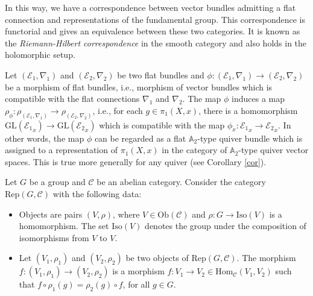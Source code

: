 \documentclass[12pt, reqno]{amsart}
\theoremstyle{plain}
\numberwithin{equation}{section}
\newcommand{\E}{\mathcal{E}}
\begin{document}
In this way, we have a correspondence between vector bundles admitting a flat connection and representations of the fundamental group. This correspondence is functorial and gives an equivalence between these two categories. It is known as the \emph{Riemann-Hilbert correspondence} in the smooth category and also holds in the holomorphic setup.


Let $(\E_1,\nabla_1)$ and $(\E_2,\nabla_2)$ be two flat bundles and $\phi:(\E_1,\nabla_1)\rightarrow (\E_2,\nabla_2)$ be a morphism of flat bundles, i.e., morphism of vector bundles which is compatible with the flat connections $\nabla_1$ and $\nabla_2$. The map $\phi$ induces a map $\rho_{\phi}: \rho_{(\E_1,\nabla_1)}\rightarrow \rho_{(\E_2,\nabla_2)}$, i.e., for each $g\in \pi_1(X,x)$, there is a homomorphism $\mathrm{GL}({\E_1}_x)\rightarrow \mathrm{GL}({\E_2}_x)$ which is compatible with the map $\phi_x:{\E_1}_x \rightarrow {\E_2}_x$. In other words, the map $\phi$ can be regarded as a flat $\mathbb{A}_2$-type quiver bundle which is assigned to a representation of $\pi_1(X,x)$ in the category of $\mathbb{A}_2$-type quiver vector spaces. This is true more generally for any quiver (see Corollary \ref{cor}).   







Let $G$ be a group and $\mathcal{C}$ be an abelian category. Consider the category $\mathrm{Rep}(G, \mathcal{C})$ with the following data:

\begin{itemize}
    \item Objects are pairs $(V, \rho)$, where $V \in \mathrm{Ob}(\mathcal{C})$ and $\rho: G\rightarrow \mathrm{Iso}(V)$ is a homomorphism. The set $\mathrm{Iso}(V)$ denotes the group under the composition of isomorphisms from $V$ to $V$.
    \item Let $(V_1,\rho_1)$ and $(V_2,\rho_2)$ be two objects of $\mathrm{Rep}(G,\mathcal{C})$. The morphism $f:(V_1,\rho_1) \rightarrow (V_2,\rho_2)$ is a morphism $f: V_1 \rightarrow V_2 \in \mathrm{Hom}_{\mathcal{C}}(V_1,V_2)$ such that $f\circ \rho_1(g) = \rho_2(g) \circ f$, for all $g\in G$.
\end{itemize}
\end{document}
